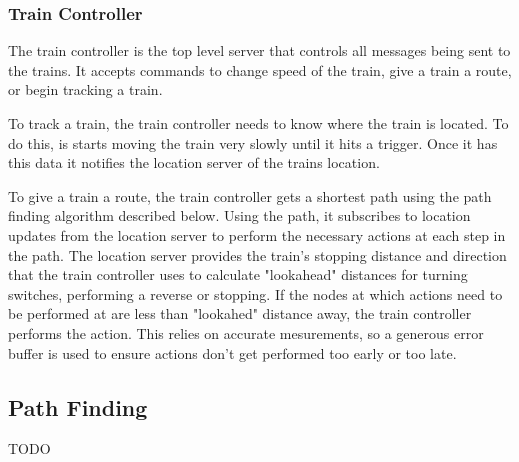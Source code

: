 \documentclass[letterpaper]{article}
\begin{document}
\subsubsection{Train Controller}

The train controller is the top level server that controls all messages being sent to the trains. It accepts commands to change speed of the train, give a train a route, or begin tracking a train.

To track a train, the train controller needs to know where the train is located. To do this, is starts moving the train very slowly until it hits a trigger. Once it has this data it notifies the location server of the trains location.

To give a train a route, the train controller gets a shortest path using the path finding algorithm described below. Using the path, it subscribes to location updates from the location server to perform the necessary actions at each step in the path. The location server provides the train's stopping distance and direction that the train controller uses to calculate "lookahead" distances for turning switches, performing a reverse or stopping. If the nodes at which actions need to be performed at are less than "lookahed" distance away, the train controller performs the action. This relies on accurate mesurements, so a generous error buffer is used to ensure actions don't get performed too early or too late.

\subsection{Path Finding}

TODO
\end{document}
